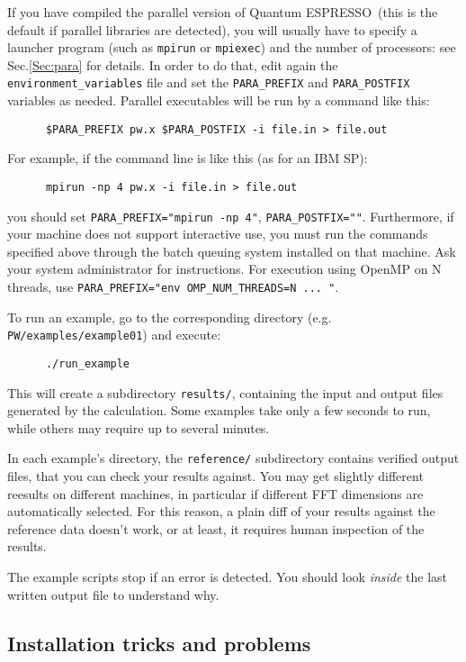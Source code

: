 \documentclass[12pt,a4paper]{article}
\def\qe{{\sc Quantum ESPRESSO}}
\begin{document}
If you have compiled the parallel version of \qe\ (this
is the default if parallel libraries are detected), you will usually
have to specify a launcher program (such as \texttt{mpirun} or
\texttt{mpiexec}) and the number of processors: see Sec.\ref{Sec:para} for
details. In order to do that, edit again the \texttt{environment\_variables}
file and set the \texttt{PARA\_PREFIX} and \texttt{PARA\_POSTFIX} variables
as needed. Parallel executables will be run by a command like this:
\begin{verbatim}
      $PARA_PREFIX pw.x $PARA_POSTFIX -i file.in > file.out
\end{verbatim}
For example, if the command line is like this (as for an IBM SP):
\begin{verbatim}
      mpirun -np 4 pw.x -i file.in > file.out
\end{verbatim}
you should set \texttt{PARA\_PREFIX="mpirun -np 4"},
\texttt{PARA\_POSTFIX=""}.
Furthermore, if your machine does not support interactive use, you
must run the commands specified above through the batch queuing
system installed on that machine. Ask your system administrator for
instructions. For execution using OpenMP on N threads,
use \texttt{PARA\_PREFIX="env OMP\_NUM\_THREADS=N ... "}.

To run an example, go to the corresponding directory (e.g.
 \texttt{PW/examples/example01}) and execute:
\begin{verbatim}
      ./run_example
\end{verbatim}
This will create a subdirectory \texttt{results/}, containing the input and
output files generated by the calculation. Some examples take only a
few seconds to run, while others may require up to several minutes.

In each example's directory, the \texttt{reference/} subdirectory contains
verified output files, that you can check your results against. You may
get slightly different reesults on different machines, in particular if
different FFT dimensions are automatically selected. For this reason, a
plain diff of your results against the reference data doesn't work, or
at least, it requires human inspection of the results.

The example scripts stop if an error is detected. You should look {\em inside}
the last written output file to understand why.

\subsection{Installation tricks and problems}
\end{document}
